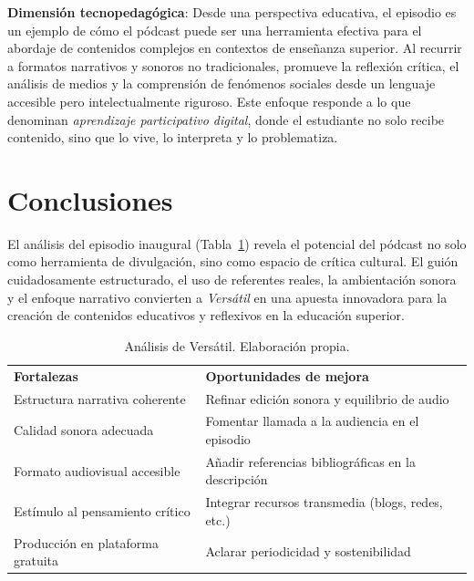 \documentclass[
  spanish,
  11pt,
  a4paper,
]{scrbook}
\begin{document}
\textbf{Dimensión tecnopedagógica}: Desde una perspectiva educativa, el
episodio es un ejemplo de cómo el pódcast puede ser una herramienta
efectiva para el abordaje de contenidos complejos en contextos de
enseñanza superior. Al recurrir a formatos narrativos y sonoros no
tradicionales, promueve la reflexión crítica, el análisis de medios y la
comprensión de fenómenos sociales desde un lenguaje accesible pero
intelectualmente riguroso. Este enfoque responde a lo que
\textcite{McLoughlin2010} denominan \emph{aprendizaje participativo
digital}, donde el estudiante no solo recibe contenido, sino que lo
vive, lo interpreta y lo problematiza.

\section*{Conclusiones}\label{conclusiones-3}


El análisis del episodio inaugural (Tabla~\ref{tbl-3}) revela el
potencial del pódcast no solo como herramienta de divulgación, sino como
espacio de crítica cultural. El guión cuidadosamente estructurado, el
uso de referentes reales, la ambientación sonora y el enfoque narrativo
convierten a \emph{Versátil} en una apuesta innovadora para la creación
de contenidos educativos y reflexivos en la educación superior.

\begingroup
\scriptsize

\begin{longtable}[]{@{}
  >{\raggedright\arraybackslash}p{}
  >{\raggedright\arraybackslash}p{}@{}}
\caption{Análisis de Versátil. Elaboración
propia.}\label{tbl-3}\tabularnewline
\toprule\noalign{}
\endfirsthead
\endhead
\bottomrule\noalign{}
\endlastfoot
\textbf{Fortalezas} & \textbf{Oportunidades de mejora} \\
Estructura narrativa coherente & Refinar edición sonora y equilibrio de
audio \\
Calidad sonora adecuada & Fomentar llamada a la audiencia en el
episodio \\
Formato audiovisual accesible & Añadir referencias bibliográficas en la
descripción \\
Estímulo al pensamiento crítico & Integrar recursos transmedia (blogs,
redes, etc.) \\
Producción en plataforma gratuita & Aclarar periodicidad y
sostenibilidad \\
\end{longtable}
\end{document}
